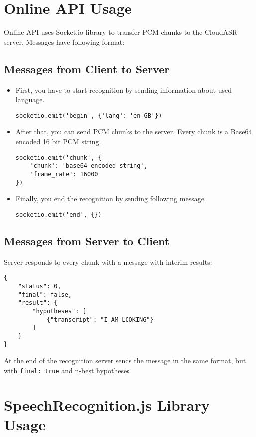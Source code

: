 \section{Online API Usage}

Online API uses Socket.io library to transfer PCM chunks to the CloudASR server.
Messages have following format:

\subsection{Messages from Client to Server}

\begin{itemize}
  \item
    First, you have to start recognition by sending information about used language.
    \begin{verbatim}socketio.emit('begin', {'lang': 'en-GB'})\end{verbatim}
  \item
    After that, you can send PCM chunks to the server. Every chunk is a Base64 encoded 16 bit PCM string.
\begin{verbatim}
socketio.emit('chunk', {
    'chunk': 'base64 encoded string',
    'frame_rate': 16000
})
\end{verbatim}
  \item
    Finally, you end the recognition by sending following message
    \begin{verbatim}socketio.emit('end', {})\end{verbatim}
\end{itemize}

\subsection{Messages from Server to Client}

Server responds to every chunk with a message with interim results:

\begin{verbatim}{
    "status": 0,
    "final": false,
    "result": {
        "hypotheses": [
            {"transcript": "I AM LOOKING"}
        ]
    }
}\end{verbatim}

At the end of the recognition server sends the message in the same format,
  but with \texttt{final: true} and n-best hypotheses.

\section{SpeechRecognition.js Library Usage}

